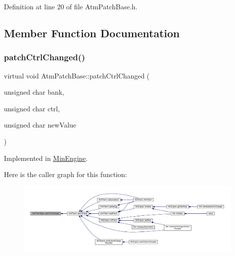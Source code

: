 Definition at line 20 of file Atm\+Patch\+Base.\+h.



\subsection{Member Function Documentation}
\mbox{\label{class_atm_patch_base_a10abe1d35a241d61a83473ef8caaee33}} 
\subsubsection{\texorpdfstring{patch\+Ctrl\+Changed()}{patchCtrlChanged()}}
{\footnotesize\ttfamily virtual void Atm\+Patch\+Base\+::patch\+Ctrl\+Changed (\begin{DoxyParamCaption}\item[{unsigned char}]{bank,  }\item[{unsigned char}]{ctrl,  }\item[{unsigned char}]{new\+Value }\end{DoxyParamCaption})\hspace{0.3cm}{\ttfamily [pure virtual]}}



Implemented in \hyperlink{class_min_engine_ad26e5e985eb56946ae93dc3274874229}{Min\+Engine}.

Here is the caller graph for this function\+:
\nopagebreak
\begin{figure}[H]
\begin{center}
\leavevmode
\includegraphics[width=350pt]{class_atm_patch_base_a10abe1d35a241d61a83473ef8caaee33_icgraph}
\end{center}
\end{figure}
\mbox{\label{class_atm_patch_base_ad31f8d45a0a630ee3052d69ee125e2f3}} 
